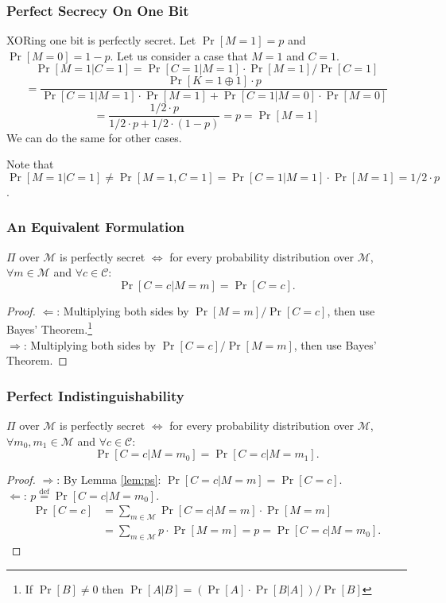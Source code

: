 \begin{frame}\frametitle{Perfect Secrecy On One Bit}

\begin{exampleblock}{XORing one bit is perfectly secret.}
Let $\Pr[M=1] = p$ and $\Pr[M=0] = 1-p$.
Let us consider a case that $M=1$ and $C=1$.
\[ \Pr[M=1 | C=1] = \Pr[C=1 | M=1 ] \cdot \Pr[ M=1 ] / \Pr[C=1] \]
\[ = \frac{\Pr[K = 1\oplus 1] \cdot p }{ \Pr[C=1 | M=1] \cdot \Pr[M=1] + \Pr[C=1 | M=0] \cdot \Pr[M=0]} \]
\[ = \frac{1/2 \cdot p }{ 1/2 \cdot p + 1/2 \cdot (1-p)} = p = \Pr[M=1] \]
We can do the same for other cases.
\end{exampleblock}
Note that $\Pr[M=1 | C=1] \neq \Pr[M=1, C=1] = \Pr[C=1 | M=1] \cdot \Pr[M=1] = 1/2 \cdot p$.
\end{frame}

\begin{frame}\frametitle{An Equivalent Formulation}
\begin{lemma} \label{lem:ps} 
$\Pi$ over $\mathcal{M}$ is perfectly secret $\iff$ for every probability distribution over $\mathcal{M}$, $\forall m \in \mathcal{M}$ and $\forall c \in \mathcal{C}$:
\[ \Pr[C=c | M=m] = \Pr[C=c].\]
\end{lemma}
\begin{proof}
$\Leftarrow$: Multiplying both sides by $\Pr[M=m]/\Pr[C=c]$, then use Bayes' Theorem.\footnote{If $\Pr[B]\neq 0$ then $ \Pr[A|B] = \left( \Pr[A] \cdot \Pr[B|A] \right) / \Pr[B] $} \\
$\Rightarrow$: Multiplying both sides by $\Pr[C=c]/\Pr[M=m]$, then use Bayes' Theorem.
\end{proof}
\end{frame}
\begin{frame}\frametitle{Perfect Indistinguishability}
\begin{lemma}\label{lem:pi}
$\Pi$ over $\mathcal{M}$ is perfectly secret $\iff$ for every probability distribution over $\mathcal{M}$, $\forall m_0, m_1 \in \mathcal{M}$ and $\forall c \in \mathcal{C}$:
\[ \Pr[C=c | M=m_0] = \Pr[C=c | M=m_1].\]
\end{lemma}
\begin{proof}
$\Rightarrow$: By Lemma \ref{lem:ps}: $\Pr[C=c | M=m] = \Pr[C=c]$. \\
$\Leftarrow$: $p \overset{\text{def}}{=} \Pr[C=c | M=m_0]$.
\[
\begin{split}
	\Pr[C=c] &= \sum_{m \in \mathcal{M}} \Pr[C=c|M=m] \cdot \Pr[M=m] \\
	&= \sum_{m \in \mathcal{M}} p \cdot \Pr[M=m] = p = \Pr[C=c|M=m_0].
\end{split}
\]
\end{proof}
\end{frame}
